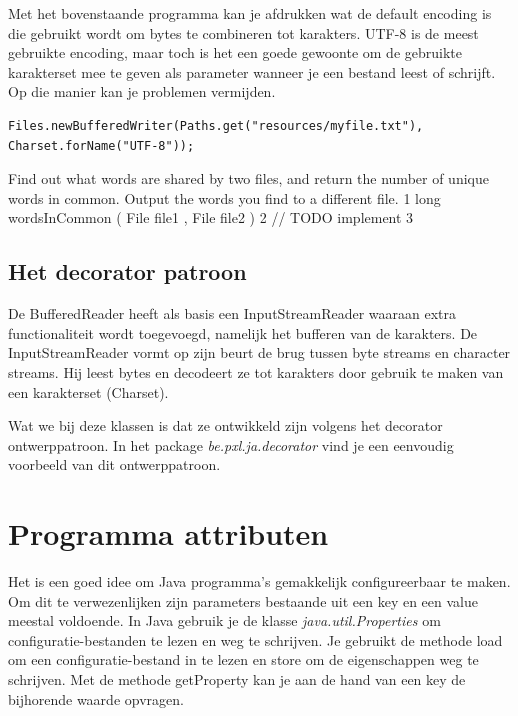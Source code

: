 Met het bovenstaande programma kan je afdrukken wat de default encoding is die gebruikt wordt om bytes te combineren tot karakters. UTF-8 is de meest gebruikte encoding, maar toch is het een goede gewoonte om de gebruikte karakterset mee te geven als parameter wanneer je een bestand leest of schrijft. Op die manier kan je problemen vermijden.

\begin{lstlisting}
Files.newBufferedWriter(Paths.get("resources/myfile.txt"), Charset.forName("UTF-8"));
\end{lstlisting}


\begin{oefening}
Find out what words are shared by two files, and return the
number of unique words in common. Output the words you find to
a different file.
1 long wordsInCommon ( File file1 , File file2 ) {
2 // TODO implement
3 }

\end{oefening}

\subsection{Het decorator patroon}

De BufferedReader heeft als basis een InputStreamReader waaraan extra functionaliteit wordt toegevoegd, namelijk het bufferen van de karakters. De InputStreamReader vormt op zijn beurt de brug tussen byte streams en character streams. Hij leest bytes en decodeert ze tot karakters door gebruik te maken van een karakterset (Charset).

Wat we bij deze klassen is dat ze ontwikkeld zijn volgens het decorator ontwerppatroon.
In het package \textit{be.pxl.ja.decorator} vind je een eenvoudig voorbeeld van dit ontwerppatroon.

\section{Programma attributen}

Het is een goed idee om Java programma's gemakkelijk configureerbaar te maken. 
Om dit te verwezenlijken zijn parameters bestaande uit een key en een value meestal voldoende. 
In Java gebruik je de klasse \textit{java.util.Properties} om configuratie-bestanden te lezen en weg te schrijven.
Je gebruikt de methode load om een configuratie-bestand in te lezen en store om de eigenschappen weg te schrijven. Met de methode getProperty kan je aan de hand van een key de bijhorende waarde opvragen.

